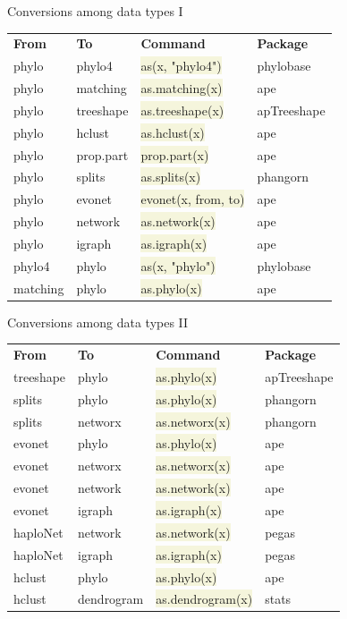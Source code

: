 \documentclass[compress, ucs, xelatex, 11pt, xcolor=svgnames, aspectratio=169,
	hyperref={
		bookmarks=true,
		unicode=true,
		colorlinks=true,
		pdftitle={Molecular data in R},
		plainpages=false,
		pdfauthor={Vojtech Zeisek},
		pdfsubject={Course about phylogeny and evolution in R},
		pdfcreator={XeLaTeX},
		pdfkeywords={R, evolution, phylogeny, molecular data},
		linkcolor=Crimson, %
		anchorcolor=Magenta, %
		citecolor=Magenta, %
		filecolor=Magenta, %
		menucolor=Magenta, %
		urlcolor=DodgerBlue, %
		pdftex},
	url={hyphens, lowtilde} %
	]{beamer}
\renewcommand{\texttt}[1]{\colorbox{Beige}{{\ttfamily #1}}}
\begin{document}
\begin{frame}{Conversions among data types I}
	\begin{tabular}{llll}
		\textbf{From} & \textbf{To} & \textbf{Command} & \textbf{Package}\\
		phylo & phylo4 & \texttt{as(x, "phylo4")} & phylobase\\
		phylo & matching & \texttt{as.matching(x)} & ape\\
		phylo & treeshape & \texttt{as.treeshape(x)} & apTreeshape\\
		phylo & hclust & \texttt{as.hclust(x)} & ape\\
		phylo & prop.part & \texttt{prop.part(x)} & ape\\
		phylo & splits & \texttt{as.splits(x)} & phangorn\\
		phylo & evonet & \texttt{evonet(x, from, to)} & ape\\
		phylo & network & \texttt{as.network(x)} & ape\\
		phylo & igraph & \texttt{as.igraph(x)} & ape\\
		phylo4 & phylo & \texttt{as(x, "phylo")} & phylobase\\
		matching & phylo & \texttt{as.phylo(x)} & ape
	\end{tabular}
\end{frame}

\begin{frame}{Conversions among data types II}
	\begin{tabular}{llll}
		\textbf{From} & \textbf{To} & \textbf{Command} & \textbf{Package}\\
		treeshape & phylo & \texttt{as.phylo(x)} & apTreeshape\\
		splits & phylo & \texttt{as.phylo(x)} & phangorn\\
		splits & networx & \texttt{as.networx(x)} & phangorn\\
		evonet & phylo & \texttt{as.phylo(x)} & ape\\
		evonet & networx & \texttt{as.networx(x)} & ape\\
		evonet & network & \texttt{as.network(x)} & ape\\
		evonet & igraph & \texttt{as.igraph(x)} & ape\\
		haploNet & network & \texttt{as.network(x)} & pegas\\
		haploNet & igraph & \texttt{as.igraph(x)} & pegas\\
		hclust & phylo & \texttt{as.phylo(x)} & ape\\
		hclust & dendrogram & \texttt{as.dendrogram(x)} & stats
	\end{tabular}
\end{frame}
\end{document}

